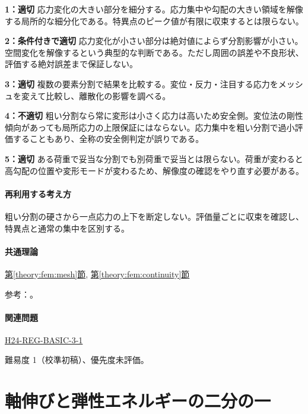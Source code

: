 \noindent\textbf{1：適切} 応力変化の大きい部分を細分する。応力集中や勾配の大きい領域を解像する局所的な細分化である。特異点のピーク値が有限に収束するとは限らない。\par

\noindent\textbf{2：条件付きで適切} 応力変化が小さい部分は絶対値によらず分割影響が小さい。空間変化を解像するという典型的な判断である。ただし周囲の誤差や不良形状、評価する絶対誤差まで保証しない。\par

\noindent\textbf{3：適切} 複数の要素分割で結果を比較する。変位・反力・注目する応力をメッシュを変えて比較し、離散化の影響を調べる。\par

\noindent\textbf{4：不適切} 粗い分割なら常に変形は小さく応力は高いため安全側。変位法の剛性傾向があっても局所応力の上限保証にはならない。応力集中を粗い分割で過小評価することもあり、全称の安全側判定が誤りである。\par

\noindent\textbf{5：適切} ある荷重で妥当な分割でも別荷重で妥当とは限らない。荷重が変わると高勾配の位置や変形モードが変わるため、解像度の確認をやり直す必要がある。\par

\paragraph{再利用する考え方} 粗い分割の硬さから一点応力の上下を断定しない。評価量ごとに収束を確認し、特異点と通常の集中を区別する。

\paragraph{共通理論} \hyperref[theory:fem:mesh]{第\ref*{theory:fem:mesh}節}, \hyperref[theory:fem:continuity]{第\ref*{theory:fem:continuity}節}

\par 参考：\cite{mit_roy_fea1999}。

\paragraph{関連問題} \hyperref[q:h24-reg-basic-3-1]{H24-REG-BASIC-3-1}

\par 難易度 1（校準初稿）、優先度未評価。

\section{軸伸びと弾性エネルギーの二分の一}

